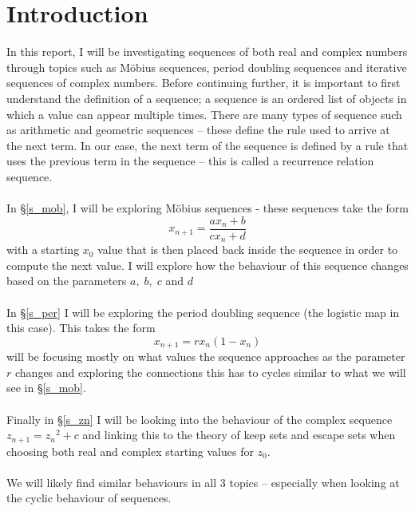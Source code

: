 \documentclass[12pt]{article}
\begin{document}
\section*{Introduction}\label{s_int}
In this report, I will be investigating sequences of both real and complex numbers through topics such as Möbius sequences, period doubling sequences and iterative sequences of complex numbers. Before continuing further, it is important to first understand the definition of a sequence; a sequence is an ordered list of objects in which a value can appear multiple times. There are many types of sequence such as arithmetic and geometric sequences -- these define the rule used to arrive at the next term. In our case, the next term of the sequence is defined by a rule that uses the previous term in the sequence -- this is called a recurrence relation sequence. \\\\
In \S\ref{s_mob}, I will be exploring Möbius sequences - these sequences take the form 
	\[x_{n+1}=\frac{ax_n+b}{cx_n+d}\] 
with a starting $x_0$ value that is then placed back inside the sequence in order to compute the next value. I will explore how the behaviour of this sequence changes based on the parameters $a,\;b,\;c$ and $d$ \\\\
In \S\ref{s_per} I will be exploring the period doubling sequence (the logistic map in this case). This takes the form
	\[x_{n+1} = rx_n(1-x_n)\]
 will be focusing mostly on what values the sequence approaches as the parameter $r$ changes and exploring the connections this has to cycles similar to what we will see in \S\ref{s_mob}.\\\\
Finally in \S\ref{s_zn} I will be looking into the behaviour of the complex sequence $z_{n+1} = {z_n}^2+c$ and linking this to the theory of keep sets and escape sets when choosing both real and complex starting values for $z_0$.\\\\
We will likely find similar behaviours in all 3 topics -- especially when looking at the cyclic behaviour of sequences.
\newpage
\end{document}
